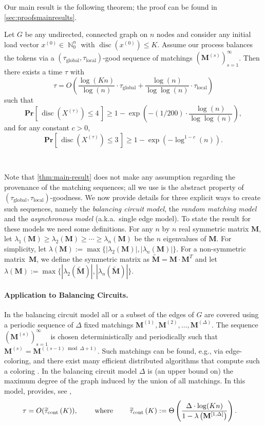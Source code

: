 \documentclass[twoside,leqno]{article}
\DeclareMathOperator{\N}{\mathbb{N}}
\newcommand{\Pro}[1]{\mathbf{Pr} \left[\,#1\,\right]}
\newcommand{\M}{\mathbf{M}}
\DeclareMathOperator{\discr}{\mathrm{disc}}
\DeclareMathOperator{\1}{\mathbf{1}}
\newcommand{\tauspectral}[1]{{\widetilde{\tau}}_{\mathrm{cont}}\left({#1}\right)}
\newcommand{\taulocal}{\tau_{\mathrm{local}}}
\newcommand{\tauglobal}{\tau_{\mathrm{global}}}
\numberwithin{equation}{section}
\begin{document}
Our main result is the following theorem; the proof can be found in \cref{sec:proofsmainresults}. \smallskip

\noindent\colorbox{black!10}{\minipage{\textwidth-2\fboxsep}
\begin{theorem}
\label{thm:main-result}%
Let $G$ be any undirected, connected graph on $n$ nodes and consider any initial load vector $x^{(0)} \in \N_0^n$ with $\discr(x^{(0)})\le K$.
Assume our process balances the tokens via a $(\tauglobal,\taulocal)$-good sequence of matchings $\left(\M^{(s)}\right)_{s=1}^{\infty}$.
Then there exists a time $\tau$ with
\[
\tau = O\left(\frac{\log (Kn)}{\log(n)}\cdot \tauglobal+\frac{\log(n)}{\log\log(n)}\cdot \taulocal\right)
\]
such that
\[
\Pro{ \discr\left(X^{(\tau)}\right) \leq 4} \geq 1 -\exp \left(- (1/200) \cdot \frac{\log(n)}{\log \log (n)} \right),
\] 
and for any constant $c > 0$,
\[
\Pro{ \discr\left(X^{(\tau)}\right) \leq 3}\geq 
1 - \exp\left(- \log^{1-c}(n) \right).
\] 
\end{theorem}\endminipage}
~

\medskip



\noindent Note that \cref{thm:main-result} does not make any assumption regarding the provenance of the matching sequences; all we use is the abstract property of $(\tauglobal,\taulocal)$-goodness. 
We now provide details for three explicit ways to create such sequences, namely the \emph{balancing circuit model}, the \emph{random matching model} and the \emph{asynchronous model} (a.k.a.~single edge model). To state the result for these models we need some definitions.
For any $n$ by $n$ real symmetric matrix $\M$, let $\lambda_1(\M)\ge \lambda_2(\M)\ge\cdots \ge \lambda_n(\M)$ be the $n$ eigenvalues of $\M$. For simplicity, let $\lambda(\M) := \max\{|\lambda_2(\M)|,|\lambda_n(\M)|\}$. For a non-symmetric matrix~$\M$, we define the  symmetric matrix as $\widetilde{\M}=\M\cdot \M^T$ and let $\lambda(\M):=\max\{|\lambda_2(\widetilde{\M})|,|\lambda_n(\widetilde{\M})|\}$. 


\paragraph{Application to Balancing Circuits.}
In the balancing circuit model all or a subset of the edges of $G$ are covered using a periodic sequence of $\Delta$ fixed matchings $\M^{(1)},\M^{(2)},\ldots,\M^{(\Delta)}$. 
The sequence $\left(\M^{(s)}\right)_{s=1}^{\infty}$ is chosen deterministically and periodically such that $\M^{(s)}=\M^{((s-1)\bmod\Delta+1)}$. Such matchings can be found, e.g., via edge-coloring, and there exist many efficient distributed algorithms that compute such a coloring \cite{DBLP:journals/jcss/GhoshM96}. In the balancing circuit model $\Delta$ is (an upper bound on) the maximum degree of the graph induced by the union of all matchings.
In this model,  provides, see ,
\begin{align}
\tau&= O(\tauspectral{K}), \qquad \mbox{ where } \qquad \tauspectral{K} := \Theta \left( \frac{\Delta \cdot \log(Kn)}{1-\lambda\left(\vphantom{X^1}\smash{\M^{[1,\Delta]}}\right)} \right). \label{eq:balancing_spectral}
\end{align}
\end{document}
